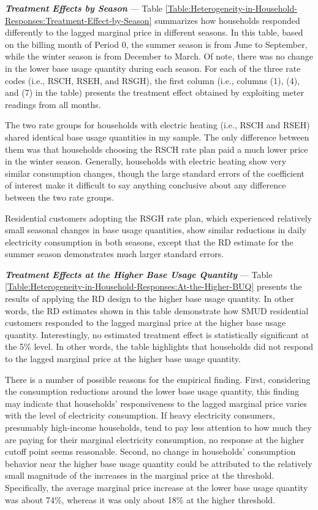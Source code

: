 \noindent
\textit{\textbf{Treatment Effects by Season}} --- 
Table \ref{Table:Heterogeneity-in-Household-Responses:Treatment-Effect-by-Season} summarizes how households responded differently to the lagged marginal price in different seasons. In this table, based on the billing month of Period 0, the summer season is from June to September, while the winter season is from December to March. Of note, there was no change in the lower base usage quantity during each season. For each of the three rate codes (i.e., RSCH, RSEH, and RSGH), the first column (i.e., columns (1), (4), and (7) in the table) presents the treatment effect obtained by exploiting meter readings from all months. 

The two rate groups for households with electric heating (i.e., RSCH and RSEH) shared identical base usage quantities in my sample. The only difference between them was that households choosing the RSCH rate plan paid a much lower price in the winter season. Generally, households with electric heating show very similar consumption changes, though the large standard errors of the coefficient of interest make it difficult to say anything conclusive about any difference between the two rate groups. 

Residential customers adopting the RSGH rate plan, which experienced relatively small seasonal changes in base usage quantities, show similar reductions in daily electricity consumption in both seasons, except that the RD estimate for the summer season demonstrates much larger standard errors. 


\par \vspace{0.5cm}
\noindent
\textit{\textbf{Treatment Effects at the Higher Base Usage Quantity}} ---
Table \ref{Table:Heterogeneity-in-Household-Responses:At-the-Higher-BUQ} presents the results of applying the RD design to the higher base usage quantity. In other words, the RD estimates shown in this table demonstrate how SMUD residential customers responded to the lagged marginal price at the higher base usage quantity. Interestingly, no estimated treatment effect is statistically significant at the 5\% level. In other words, the table highlights that households did not respond to the lagged marginal price at the higher base usage quantity. 

There is a number of possible reasons for the empirical finding. First, considering the consumption reductions around the lower base usage quantity, this finding may indicate that households' responsiveness to the lagged marginal price varies with the level of electricity consumption. If heavy electricity consumers, presumably high-income households, tend to pay less attention to how much they are paying for their marginal electricity consumption, no response at the higher cutoff point seems reasonable. Second, no change in households' consumption behavior near the higher base usage quantity could be attributed to the relatively small magnitude of the increases in the marginal price at the threshold. Specifically, the average marginal price increase at the lower base usage quantity was about 74\%, whereas it was only about 18\% at the higher threshold. 
